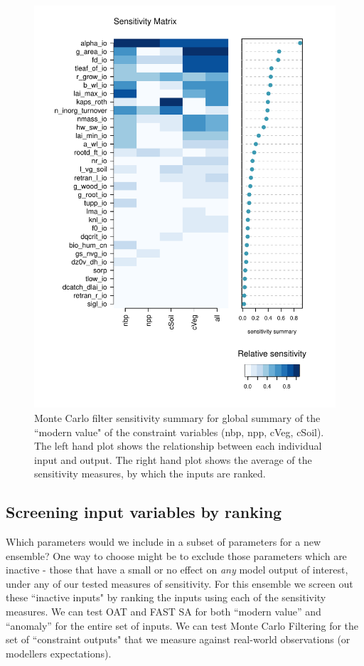 \documentclass[gmd, manuscript]{copernicus}
\begin{document}
\begin{figure}[t]
\includegraphics[width=12cm]{./figs/fig12.pdf}
\caption{Monte Carlo filter sensitivity summary for global summary of the ``modern value" of the constraint variables (nbp, npp, cVeg, cSoil). The left hand plot shows the relationship between each individual input and output. The right hand plot shows the average of the sensitivity measures, by which the inputs are ranked.}
\label{fig:MCF_sensmat_Yconst_level1a_wave01}
\end{figure}

\subsection{Screening input variables by  ranking}\label{ssec:sa_ranking}

Which parameters would we include in a subset of parameters for a new ensemble?  One way to choose might be to exclude those parameters which are inactive - those that have a small or no effect on \emph{any} model output of interest, under any of our tested measures of sensitivity. For this ensemble we screen out these ``inactive inputs" by ranking the inputs using each of the sensitivity measures. We can test OAT and FAST SA for both ``modern value'' and ``anomaly'' for the entire set of inputs. We can test Monte Carlo Filtering for the set of ``constraint outputs" that we measure against real-world observations (or modellers expectations).
\end{document}
